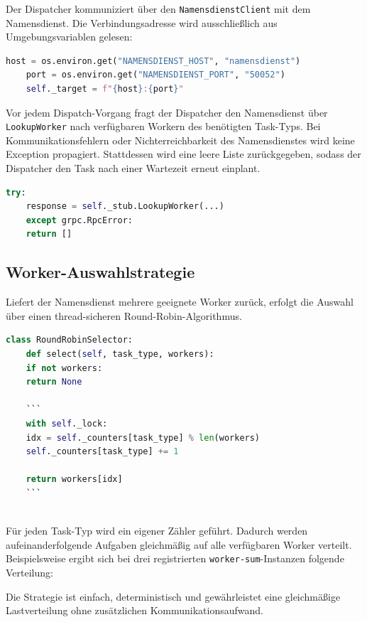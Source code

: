 Der Dispatcher kommuniziert über den \texttt{NamensdienstClient} mit dem Namensdienst.
Die Verbindungsadresse wird ausschließlich aus Umgebungsvariablen gelesen:

\begin{lstlisting}[language=Python,caption={NamensdienstClient-Konfiguration}]
	host = os.environ.get("NAMENSDIENST_HOST", "namensdienst")
	port = os.environ.get("NAMENSDIENST_PORT", "50052")
	self._target = f"{host}:{port}"
\end{lstlisting}
Vor jedem Dispatch-Vorgang fragt der Dispatcher den Namensdienst über \texttt{LookupWorker} nach verfügbaren Workern des benötigten Task-Typs.
Bei Kommunikationsfehlern oder Nichterreichbarkeit des Namensdienstes wird keine Exception propagiert.
Stattdessen wird eine leere Liste zurückgegeben, sodass der Dispatcher den Task nach einer Wartezeit erneut einplant.

\begin{lstlisting}[language=Python,caption={Fehlertoleranter Worker-Lookup}]
	try:
	response = self._stub.LookupWorker(...)
	except grpc.RpcError:
	return []
\end{lstlisting}

\subsection{Worker-Auswahlstrategie}

Liefert der Namensdienst mehrere geeignete Worker zurück, erfolgt die Auswahl über einen thread-sicheren Round-Robin-Algorithmus.

\begin{lstlisting}[language=Python,caption={Round-Robin-Selektion}]
	class RoundRobinSelector:
	def select(self, task_type, workers):
	if not workers:
	return None
	
	```
	with self._lock:
	idx = self._counters[task_type] % len(workers)
	self._counters[task_type] += 1
	
	return workers[idx]
	```
	
\end{lstlisting}
Für jeden Task-Typ wird ein eigener Zähler geführt.
Dadurch werden aufeinanderfolgende Aufgaben gleichmäßig auf alle verfügbaren Worker verteilt.
Beispielsweise ergibt sich bei drei registrierten \texttt{worker-sum}-Instanzen folgende Verteilung:


\noindent Die Strategie ist einfach, deterministisch und gewährleistet eine gleichmäßige Lastverteilung ohne zusätzlichen Kommunikationsaufwand.

